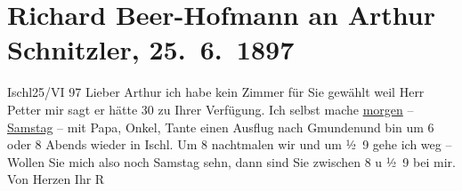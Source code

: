 

         
         \renewcommand{\erwaehntePersonen}{Personen: Hermann Beer, Sigmund Beer, Agnes Beer, Richard Beer-Hofmann, Leopold Petter}
         \renewcommand{\erwaehnteOrte}{Orte: Bad Ischl, Gmunden, Wien}
         \renewcommand{\erwaehnteWerke}{}
               \section[Richard Beer-Hofmann an Arthur Schnitzler, 25. 6. 1897]{ Richard Beer-Hofmann an Arthur Schnitzler, 25. 6. 1897}\nopagebreak{}\rehead{ }\begin{ledgroupsized}[t]{13cm}\normalsize\beginnumbering \toendnotes[C]{\smallbreak\pagebreak[2]} 
\toendnotes[C]{\smallbreak}\pstart
           \raggedleft{}{\pb}Ischl25/VI 97\pend
           \pstart
           Lieber Arthur ich habe kein Zimmer für Sie gewählt weil Herr Petter mir sagt er hätte 30 zu Ihrer Verfügung.
               Ich selbst mache \uline{morgen} – \uline{Samstag} – mit Papa, Onkel, Tante einen Ausflug nach Gmundenund bin um 6 oder
                  8 Abends wieder in Ischl. Um
                  8 nachtmalen wir und um ½ 9 gehe ich weg – Wollen Sie
               mich also noch Samstag sehn, dann sind Sie zwischen 8 u
                  ½ 9 bei mir. Von Herzen Ihr \spacefill\mbox{R}\pend
           
         
         \endnumbering{}\end{ledgroupsized}  \newcommand{\dateiname}{L00692}\newcommand{\titel}{Richard Beer-Hofmann an Arthur Schnitzler, 25. 6. 1897}\newcommand{\editorInnen}{Martin Anton Müller und Gerd-Hermann Susen}
      